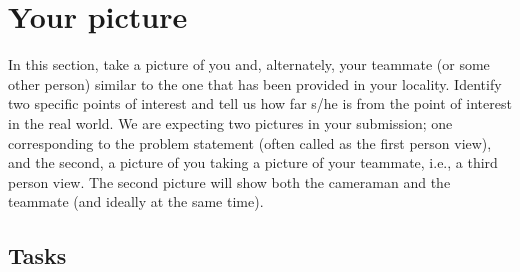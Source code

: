 \section{Your picture}

In this section, take a picture of you and, alternately, your teammate
(or some other person) similar to the one that has been provided in
your locality. Identify two specific points of interest and tell us
how far s/he is from the point of interest in the real world. We are
expecting two pictures in your submission; one corresponding to the
problem statement (often called as the first person view), and the
second, a picture of you taking a picture of your teammate, i.e., a
third person view. The second picture will show both the cameraman and
the teammate (and ideally at the same time).

\subsection{Tasks}

